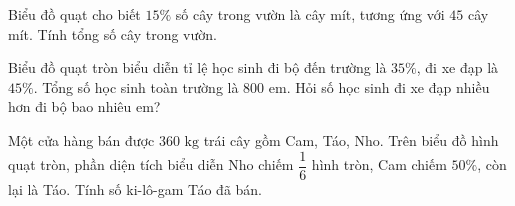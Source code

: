 \begin{ex} %
Biểu đồ quạt cho biết $15\%$ số cây trong vườn là cây mít, tương ứng với $45$ cây mít. Tính tổng số cây trong vườn.
\end{ex}

\begin{ex} %
Biểu đồ quạt tròn biểu diễn tỉ lệ học sinh đi bộ đến trường là $35\%$, đi xe đạp là $45\%$. Tổng số học sinh toàn trường là $800$ em. Hỏi số học sinh đi xe đạp nhiều hơn đi bộ bao nhiêu em?
\end{ex}

\begin{ex} %
Một cửa hàng bán được $360\text{ kg}$ trái cây gồm Cam, Táo, Nho. Trên biểu đồ hình quạt tròn, phần diện tích biểu diễn Nho chiếm $\dfrac{1}{6}$ hình tròn, Cam chiếm $50\%$, còn lại là Táo. Tính số ki-lô-gam Táo đã bán.
\end{ex}
